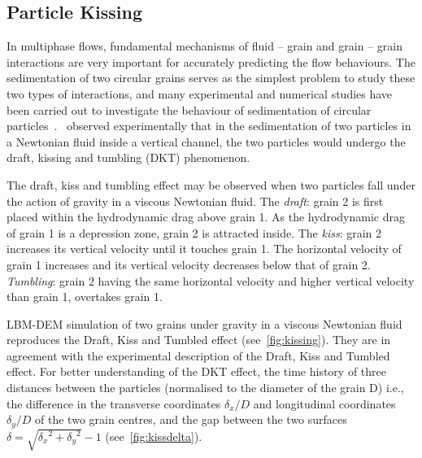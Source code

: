 \subsection{Particle Kissing}

In multiphase flows, fundamental mechanisms of fluid -- grain and grain – grain 
interactions are very important for accurately predicting the flow behaviours. 
The sedimentation of two circular grains serves as the simplest problem to 
study these two types of interactions, and many experimental and numerical 
studies have been carried out to investigate the behaviour of sedimentation
of circular particles~\citep{Wang2014,Komiwes2005}.~\citet{Fortes1987} observed 
experimentally that in the sedimentation of two particles in a Newtonian fluid 
inside a vertical channel, the two particles would undergo the draft, 
kissing and tumbling (DKT) phenomenon.

The draft, kiss and tumbling effect may be observed when two particles fall 
under the action of gravity in a viscous Newtonian fluid. The 
\emph{draft}: grain 2 is first placed within the hydrodynamic drag above 
grain 1. As the hydrodynamic drag of grain 1 is a depression zone, 
grain 2 is attracted inside. The \emph{kiss}: grain 2 increases its 
vertical velocity until it touches grain 1. The horizontal velocity of 
grain 1 increases and its vertical velocity decreases below that of 
grain 2. \emph{Tumbling}: grain 2 having the same horizontal velocity and 
higher vertical velocity than grain 1, overtakes grain 1.
%

LBM-DEM simulation of two grains under gravity in a viscous Newtonian fluid 
reproduces the Draft, Kiss and Tumbled effect (see~\cref{fig:kissing}). They 
are in agreement with the experimental description of the Draft, Kiss and 
Tumbled effect. For better understanding of the DKT effect, the time history of 
three distances between the particles (normalised to the diameter of the grain 
D) i.e., the difference in the transverse coordinates $\delta_x/D$ and 
longitudinal coordinates $\delta_y/D$ of the two grain centres, and the gap 
between the two surfaces $\delta = \sqrt{{\delta_x}^2+{\delta_y}^2} - 1 $ 
(see~\cref{fig:kissdelta}). 

